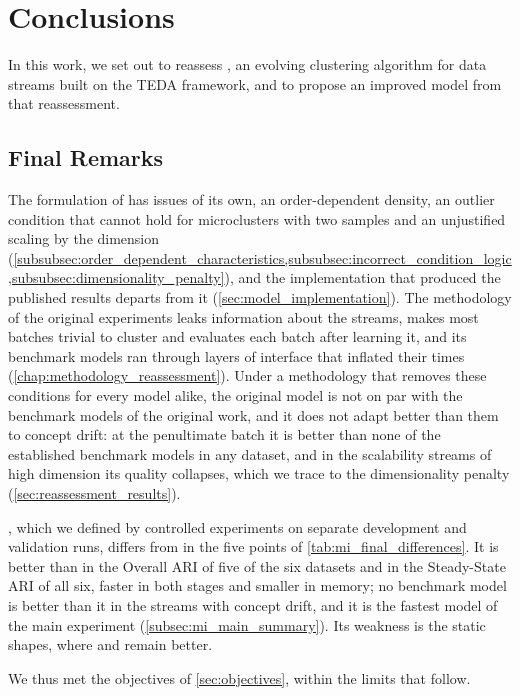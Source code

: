 \chapter{Conclusions}
\label{chap:conclusions}

In this work, we set out to reassess \MicroTEDAClus, an evolving clustering algorithm for data streams built on the TEDA framework, and to propose an improved model from that reassessment.

\section{Final Remarks}
\label{sec:final_remarks}

The formulation of \MicroTEDAClus has issues of its own, an order-dependent density, an outlier condition that cannot hold for microclusters with two samples and an unjustified scaling by the dimension (\cref{subsubsec:order_dependent_characteristics,subsubsec:incorrect_condition_logic,subsubsec:dimensionality_penalty}), and the implementation that produced the published results departs from it (\cref{sec:model_implementation}). The methodology of the original experiments leaks information about the streams, makes most batches trivial to cluster and evaluates each batch after learning it, and its benchmark models ran through layers of interface that inflated their times (\cref{chap:methodology_reassessment}). Under a methodology that removes these conditions for every model alike, the original model is not on par with the benchmark models of the original work, and it does not adapt better than them to concept drift: at the penultimate batch it is better than none of the established benchmark models in any dataset, and in the scalability streams of high dimension its quality collapses, which we trace to the dimensionality penalty (\cref{sec:reassessment_results}).

\MicroTEDAClusPlus, which we defined by controlled experiments on separate development and validation runs, differs from \MicroTEDAClus in the five points of \cref{tab:mi_final_differences}. It is better than \MicroTEDAClus in the Overall ARI of five of the six datasets and in the Steady-State ARI of all six, faster in both stages and smaller in memory; no benchmark model is better than it in the streams with concept drift, and it is the fastest model of the main experiment (\cref{subsec:mi_main_summary}). Its weakness is the static shapes, where \CluStream and \StreamKM remain better.

We thus met the objectives of \cref{sec:objectives}, within the limits that follow.

